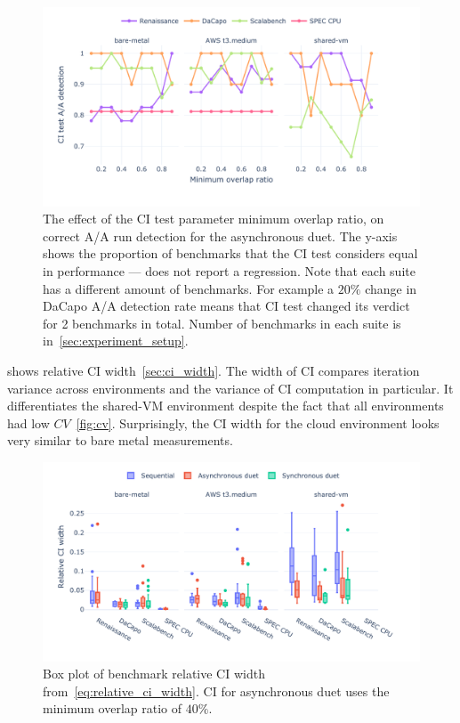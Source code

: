 \begin{figure}
	\centering
	\includegraphics[width=1\linewidth]{./figures/citest_aa_match_by_overlap.pdf}
	\caption{
		The effect of the CI test parameter minimum overlap ratio, on correct A/A run detection for the asynchronous duet.
		The \mbox{y-axis} shows the proportion of benchmarks that the CI test considers equal in performance --- does not report a regression.
		Note that each suite has a different amount of benchmarks.
		For example a $20\%$ change in DaCapo A/A detection rate means that CI test changed its verdict for 2 benchmarks in total.
		Number of benchmarks in each suite is in~\cref{sec:experiment_setup}.
	}
	\label{fig:citest_overlap_aa}
\end{figure}

 shows relative CI width~\ref{sec:ci_width}.
The width of CI compares iteration variance across environments and the variance of CI computation in particular.
It differentiates the \mbox{shared-VM} environment despite the fact that all environments had low $CV$~\ref{fig:cv}.
Surprisingly, the CI width for the cloud environment looks very similar to bare metal measurements.

\begin{figure}
	\centering
	\includegraphics[width=1\linewidth]{./figures/ci_width.pdf}
	\caption{
		Box plot of benchmark relative CI width from~\cref{eq:relative_ci_width}.
		CI for asynchronous duet uses the minimum overlap ratio of $40\%$.
	}
	\label{fig:ci_width}
\end{figure}

